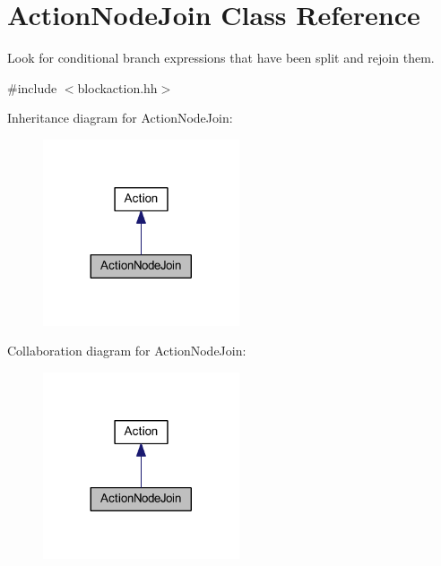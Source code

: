 \hypertarget{class_action_node_join}{}\section{Action\+Node\+Join Class Reference}
\label{class_action_node_join}


Look for conditional branch expressions that have been split and rejoin them.  




{\ttfamily \#include $<$blockaction.\+hh$>$}



Inheritance diagram for Action\+Node\+Join\+:
\nopagebreak
\begin{figure}[H]
\begin{center}
\leavevmode
\includegraphics[width=164pt]{class_action_node_join__inherit__graph}
\end{center}
\end{figure}


Collaboration diagram for Action\+Node\+Join\+:
\nopagebreak
\begin{figure}[H]
\begin{center}
\leavevmode
\includegraphics[width=164pt]{class_action_node_join__coll__graph}
\end{center}
\end{figure}
